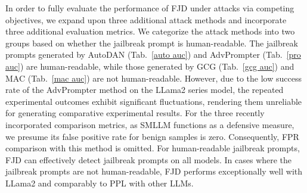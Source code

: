 \documentclass{article}
\begin{document}
In order to fully evaluate the performance of FJD under attacks via competing objectives, we expand upon three additional attack methods and incorporate three additional evaluation metrics. We categorize the attack methods into two groups based on whether the jailbreak prompt is human-readable. The jailbreak prompts generated by AutoDAN (Tab.~\ref{auto auc}) and AdvPrompter (Tab.~\ref{pro auc}) are human-readable, while those generated by GCG (Tab.~\ref{gcg auc}) and MAC (Tab.~\ref{mac auc}) are not human-readable. However, due to the low success rate of the AdvPrompter method on the LLama2 series model, the repeated experimental outcomes exhibit significant fluctuations, rendering them unreliable for generating comparative experimental results. For the three recently incorporated comparison metrics, as SMLLM functions as a defensive measure, we presume its false positive rate for benign samples is zero. Consequently, FPR comparison with this method is omitted. For human-readable jailbreak prompts, FJD can effectively detect jailbreak prompts on all models. In cases where the jailbreak prompts are not human-readable, FJD performs exceptionally well with LLama2 and comparably to PPL with other LLMs.
\end{document}
